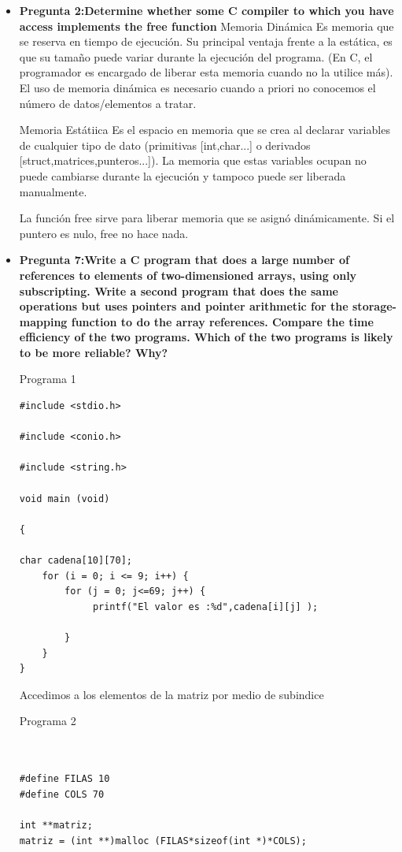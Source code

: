 \documentclass[12pt,oneside]{article}
\begin{document}
\begin{itemize}
					
				\item {\bf Pregunta 2:Determine whether some C compiler to which you have access implements
the free function}
Memoria Dinámica 
Es memoria que se reserva en tiempo de ejecución. Su principal ventaja frente a la estática, es que su tamaño puede variar durante la ejecución del programa. (En C, el programador es encargado de liberar esta memoria cuando no la utilice más). El uso de memoria dinámica es necesario cuando a priori no conocemos el número de datos/elementos a tratar.

Memoria Estátiica
Es el espacio en memoria que se crea al declarar variables de cualquier tipo de dato (primitivas [int,char...] o derivados [struct,matrices,punteros...]). La memoria que estas variables ocupan no puede cambiarse durante la ejecución y tampoco puede ser liberada manualmente.

La función free sirve para liberar memoria que se asignó dinámicamente. Si el puntero es nulo, free no hace nada.


					
				\item {\bf Pregunta 7:Write a C program that does a large number of references to elements
of two-dimensioned arrays, using only subscripting. Write a second
program that does the same operations but uses pointers and pointer
arithmetic for the storage-mapping function to do the array references.
Compare the time efficiency of the two programs. Which of the two
programs is likely to be more reliable? Why?}

Programa 1
							\begin{lstlisting}[frame = single] 
#include <stdio.h>

#include <conio.h>

#include <string.h>

void main (void)

{

char cadena[10][70];
	for (i = 0; i <= 9; i++) {
		for (j = 0; j<=69; j++) {
		     printf("El valor es :%d",cadena[i][j] );

		}						
	}
}
							\end{lstlisting}
Accedimos a los elementos de la matriz por medio de subindice 

							Programa 2
							\begin{lstlisting}[frame = single] 


#define FILAS 10
#define COLS 70

int **matriz;
matriz = (int **)malloc (FILAS*sizeof(int *)*COLS);
 

\end{lstlisting}
\end{itemize}
\end{document}
